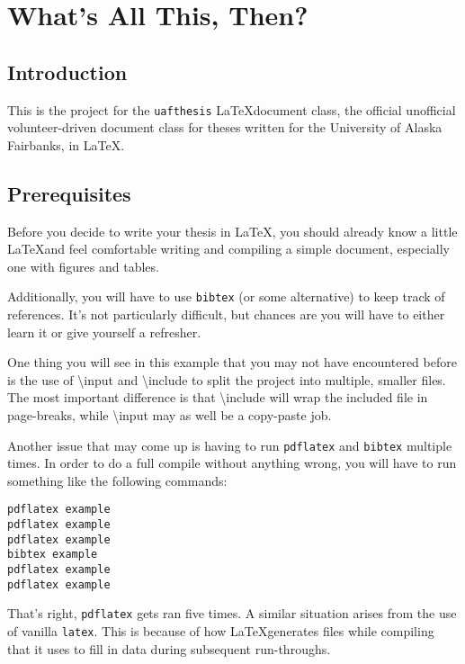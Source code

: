 \chapter{What's All This, Then?}

\section{Introduction}

This is the project for the \texttt{uafthesis} \LaTeX document class, the
official unofficial volunteer-driven document class for theses written for the
University of Alaska Fairbanks, in \LaTeX.

\section{Prerequisites}

Before you decide to write your thesis in \LaTeX, you should already know a
little \LaTeX and feel comfortable writing and compiling a simple document,
especially one with figures and tables.

Additionally, you will have to use \texttt{bibtex} (or some alternative) to keep
track of references. It's not particularly difficult, but chances are you will
have to either learn it or give yourself a refresher.

One thing you will see in this example that you may not have encountered before
is the use of \textbackslash input and \textbackslash include to split the project into multiple, smaller
files. The most important difference is that \textbackslash include will wrap the included
file in page-breaks, while \textbackslash input may as well be a copy-paste job.

Another issue that may come up is having to run \texttt{pdflatex} and
\texttt{bibtex} multiple times. In order to do a full compile without anything
wrong, you will have to run something like the following commands:

\begin{verbatim}
pdflatex example
pdflatex example
pdflatex example
bibtex example
pdflatex example
pdflatex example
\end{verbatim}

That's right, \texttt{pdflatex} gets ran five times. A similar situation arises
from the use of vanilla \texttt{latex}. This is because of how \LaTeX generates
files while compiling that it uses to fill in data during subsequent 
run-throughs.

